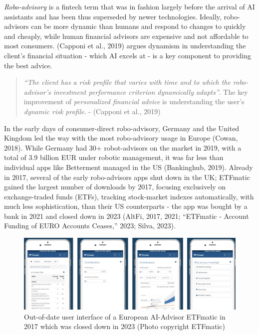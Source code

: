\documentclass[
  12pt,
  letterpaper,
  DIV=11,
  numbers=noendperiod]{scrartcl}
\begin{document}
\emph{Robo-advisory} is a fintech term that was in fashion largely
before the arrival of AI assistants and has been thus superseded by
newer technologies. Ideally, robo-advisors can be more dynamic than
humans and respond to changes to quickly and cheaply, while human
financial advisors are expensive and not affordable to most consumers.
(Capponi et al., 2019) argues dynamism in understanding the client's
financial situation - which AI excels at - is a key component to
providing the best advice.

\begin{quote}
\emph{``The client has a risk profile that varies with time and to which
the robo-advisor's investment performance criterion dynamically
adapts''}. The key improvement of \emph{personalized financial advice}
is understanding the user's \emph{dynamic risk profile}. - (Capponi et
al., 2019)
\end{quote}

In the early days of consumer-direct robo-advisory, Germany and the
United Kingdom led the way with the most robo-advisory usage in Europe
(Cowan, 2018). While Germany had 30+ robot-advisors on the market in
2019, with a total of 3.9 billion EUR under robotic management, it was
far less than individual apps like Betterment managed in the US
(Bankinghub, 2019). Already in 2017, several of the early robo-advisors
apps shut down in the UK; ETFmatic gained the largest number of
downloads by 2017, focusing exclusively on exchange-traded funds (ETFs),
tracking stock-market indexes automatically, with much less
sophistication, than their US counterparts - the app was bought by a
bank in 2021 and closed down in 2023 (AltFi, 2017, 2021; {``{ETFmatic} -
{Account} Funding of {EURO} Accounts Ceases,''} 2023; Silva, 2023).

\begin{figure}[H]

{\centering \includegraphics[width=1\linewidth,height=\textheight,keepaspectratio]{./images/ai/etfmatic.png}

}

\caption{Out-of-date user interface of a European AI-Advisor ETFmatic in
2017 which was closed down in 2023 (Photo copyright ETFmatic)}

\end{figure}%
\end{document}
